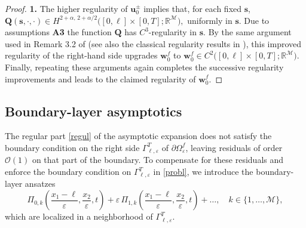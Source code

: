 \documentclass[reqno]{amsart}            %
\numberwithin{equation}{section}
\begin{document}
\begin{proof} {\bf 1.}
		The higher regularity of $\mathbf{u}^\pm_0$ implies that, for each fixed \(\mathbf{s}\),  
		$\mathbf{Q}(\mathbf{s},\cdot,\cdot) \in 
		H^{2+\alpha,\,2+\alpha/2}\big([0,\ell]\times[0,T];\mathbb{R}^\mathcal{M}\big),
		$
		uniformly in $\mathbf{s}$. Due to assumptions {\bf A3} the function $\mathbf{Q}$ has $C^3$-regularity in $\mathbf{s}.$ By the same argument used in Remark 3.2 of \cite{Mel-Roh_JMAA-2024} (see also the classical regularity results in \cite{Friedrichs1948}), this improved regularity of the right-hand side upgrades \(\mathbf{w}_0^f\) to
		$
		\mathbf{w}_0^f\in C^{2}\big([0,\ell]\times[0,T];\mathbb{R}^\mathcal{M}\big).
		$
		Finally, repeating these arguments again completes the successive regularity improvements and leads to the claimed regularity of $\mathbf{w}_0^f.$
	\end{proof}	
	
	
	\subsection{Boundary-layer asymptotics}\label{BLPs}
	The regular part \eqref{regul} of the asymptotic expansion does not satisfy the boundary condition on the right side $\Gamma^T_{\ell,\varepsilon}$ of $\partial\Omega^f_\varepsilon$, leaving residuals of order $\mathcal{O}(1)$ on that part of the boundary. To compensate for these residuals and enforce the boundary condition on $\Gamma^T_{\ell,\varepsilon}$ in \eqref{probl}, we introduce the boundary-layer ansatzes
	\begin{equation}\label{prim+}
		\Pi_{0,k}\left(\frac{x_1 - \ell}{\varepsilon}, \frac{x_2}{\varepsilon}, t\right) + \varepsilon \, \Pi_{1,k}\left(\frac{x_1 - \ell}{\varepsilon}, \frac{x_2}{\varepsilon}, t\right)
		+ \ldots, \quad k \in \{1,\ldots,\mathcal{M}\},
	\end{equation}
	which are localized in a neighborhood of $\Gamma^T_{\ell,\varepsilon}$.
	
\end{document}
